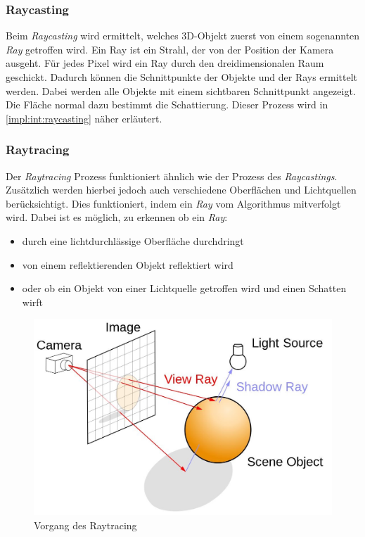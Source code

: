\subsubsection{Raycasting}
\label{impl:rend:raycasting}
Beim \emph{Raycasting} wird ermittelt, welches 3D-Objekt zuerst von einem sogenannten \emph{Ray} getroffen wird. Ein Ray ist ein Strahl, der von der Position der Kamera ausgeht. Für jedes Pixel wird ein Ray durch den dreidimensionalen Raum geschickt. Dadurch können die Schnittpunkte der Objekte und der Rays ermittelt werden. Dabei werden alle Objekte mit einem sichtbaren Schnittpunkt angezeigt. Die Fläche normal dazu bestimmt die Schattierung. Dieser Prozess wird in \ref{impl:int:raycasting} näher erläutert.
\cite{Rendering3DModels} 

\subsubsection{Raytracing}
Der \emph{Raytracing} Prozess funktioniert ähnlich wie der Prozess des \emph{Raycastings}. Zusätzlich werden hierbei jedoch auch verschiedene Oberflächen und Lichtquellen berücksichtigt. Dies funktioniert, indem ein \emph{Ray} vom Algorithmus mitverfolgt wird. Dabei ist es möglich, zu erkennen ob ein \emph{Ray}:
\begin{itemize}
    \item durch eine lichtdurchlässige Oberfläche durchdringt
    \item von einem reflektierenden Objekt reflektiert wird
    \item oder ob ein Objekt von einer Lichtquelle getroffen wird und einen Schatten wirft \cite{RayTracingRasterization}
\end{itemize}


\begin{figure} [h]
    \centering
    \includegraphics[scale=0.3]{pics/ray-tracing.jpg}
    \caption{Vorgang des Raytracing \cite{RayTracingRasterization}}
    \label{fig:impl:ray-tracing}
\end{figure}


